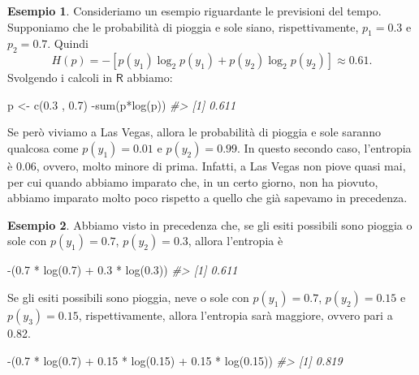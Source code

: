 \documentclass[
  10pt,
  italian,
  a4paper,
  extrafontsizes,onecolumn,openright
  ]{memoir}
\newenvironment{Shaded}{\begin{snugshade}}{\end{snugshade}}
\newcommand{\CommentTok}[1]{\textcolor[rgb]{0.56,0.35,0.01}{\textit{#1}}}
\newcommand{\FloatTok}[1]{\textcolor[rgb]{0.00,0.00,0.81}{#1}}
\newcommand{\FunctionTok}[1]{\textcolor[rgb]{0.00,0.00,0.00}{#1}}
\newcommand{\NormalTok}[1]{#1}
\newcommand{\OtherTok}[1]{\textcolor[rgb]{0.56,0.35,0.01}{#1}}
\newcommand{\SpecialCharTok}[1]{\textcolor[rgb]{0.00,0.00,0.00}{#1}}
\newcommand{\R}{\textsf{R}} %
\theoremstyle{definition}
\theoremstyle{definition}
\newtheorem{example}{Esempio}[chapter]
\theoremstyle{definition}
\theoremstyle{definition}
\theoremstyle{remark}
\begin{document}
\begin{example}
Consideriamo un esempio riguardante le previsioni del tempo. Supponiamo che le probabilità di pioggia e sole siano, rispettivamente, \(p_1 = 0.3\) e \(p_2 = 0.7\). Quindi
\[
H(p) = − [p(y_1) \log_2 p(y_1) + p(y_2) \log_2 p(y_2)] \approx 0.61.
\]
\noindent
Svolgendo i calcoli in \(\R\) abbiamo:

\begin{Shaded}
\begin{Highlighting}[]
\NormalTok{p }\OtherTok{\textless{}{-}} \FunctionTok{c}\NormalTok{(}\FloatTok{0.3}\NormalTok{ , }\FloatTok{0.7}\NormalTok{)}
\SpecialCharTok{{-}}\FunctionTok{sum}\NormalTok{(p}\SpecialCharTok{*}\FunctionTok{log}\NormalTok{(p))}
\CommentTok{\#\textgreater{} [1] 0.611}
\end{Highlighting}
\end{Shaded}

\noindent
Se però viviamo a Las Vegas, allora le probabilità di pioggia e sole saranno qualcosa come \(p(y_1) = 0.01\) e \(p(y_2) = 0.99\). In questo secondo caso, l'entropia è 0.06, ovvero, molto minore di prima. Infatti, a Las Vegas non piove quasi mai, per cui quando abbiamo imparato che, in un certo giorno, non ha piovuto, abbiamo imparato molto poco rispetto a quello che già sapevamo in precedenza.
\end{example}

\begin{example}

Abbiamo visto in precedenza che, se gli esiti possibili sono pioggia o sole con \(p(y_1) = 0.7\), \(p(y_2) = 0.3\), allora l'entropia è

\begin{Shaded}
\begin{Highlighting}[]
\SpecialCharTok{{-}}\NormalTok{(}\FloatTok{0.7} \SpecialCharTok{*} \FunctionTok{log}\NormalTok{(}\FloatTok{0.7}\NormalTok{) }\SpecialCharTok{+} \FloatTok{0.3} \SpecialCharTok{*} \FunctionTok{log}\NormalTok{(}\FloatTok{0.3}\NormalTok{))}
\CommentTok{\#\textgreater{} [1] 0.611}
\end{Highlighting}
\end{Shaded}

\noindent
Se gli esiti possibili sono pioggia, neve o sole con \(p(y_1) = 0.7\), \(p(y_2) = 0.15\) e \(p(y_3) = 0.15\), rispettivamente, allora l'entropia sarà maggiore, ovvero pari a 0.82.

\begin{Shaded}
\begin{Highlighting}[]
\SpecialCharTok{{-}}\NormalTok{(}\FloatTok{0.7} \SpecialCharTok{*} \FunctionTok{log}\NormalTok{(}\FloatTok{0.7}\NormalTok{) }\SpecialCharTok{+} \FloatTok{0.15} \SpecialCharTok{*} \FunctionTok{log}\NormalTok{(}\FloatTok{0.15}\NormalTok{) }\SpecialCharTok{+} \FloatTok{0.15} \SpecialCharTok{*} \FunctionTok{log}\NormalTok{(}\FloatTok{0.15}\NormalTok{))}
\CommentTok{\#\textgreater{} [1] 0.819}
\end{Highlighting}
\end{Shaded}

\end{example}
\end{document}
